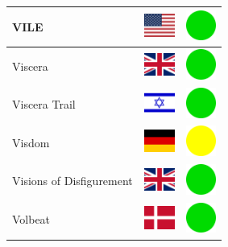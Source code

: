 \documentclass[12pt, a4paper, twoside]{report}
\begin{document}
\begin{center}
\begin{longtable}{|p{5cm}|p{2cm}|p{2cm}|}
 VILE                                                       & \includegraphics[width=1cm]{4x3/us} &   \includegraphics[width=1cm]{likes/y} \\ \hline
 Viscera                                                    & \includegraphics[width=1cm]{4x3/gb} &   \includegraphics[width=1cm]{likes/y} \\ \hline
 Viscera Trail                                              & \includegraphics[width=1cm]{4x3/il} &   \includegraphics[width=1cm]{likes/y} \\ \hline
 Visdom                                                     & \includegraphics[width=1cm]{4x3/de} &   \includegraphics[width=1cm]{likes/m} \\ \hline
 Visions of Disfigurement                                   & \includegraphics[width=1cm]{4x3/gb} &   \includegraphics[width=1cm]{likes/y} \\ \hline
 Volbeat                                                    & \includegraphics[width=1cm]{4x3/dk} &   \includegraphics[width=1cm]{likes/y} \\ \hline

\end{longtable}
\end{center}
\end{document}
